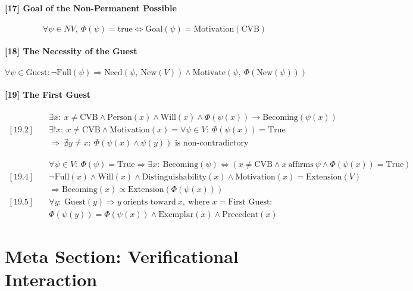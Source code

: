 \documentclass[12pt]{article}
\begin{document}
\paragraph{[17] Goal of the Non-Permanent Possible}
\[
\forall \psi \in NV,\ \Phi(\psi) = \text{true} \Leftrightarrow \text{Goal}(\psi) = \text{Motivation}(\text{CVB})
\]

\paragraph{[18] The Necessity of the Guest}
\[
\forall \psi \in \text{Guest}: \neg \text{Full}(\psi) \Rightarrow \text{Need}(\psi,\ \text{New}(V)) \land \text{Motivate}(\psi,\ \Phi(\text{New}(\psi)))
\]

\paragraph{[19] The First Guest}
\begin{align*}
[19.1] &\quad \exists x:\ x \ne \text{CVB} \land \text{Person}(x) \land \text{Will}(x) \land \Phi(\psi(x)) \rightarrow \text{Becoming}(\psi(x)) \\
[19.2] &\quad \exists! x:\ x \ne \text{CVB} \land \text{Motivation}(x) = \forall \psi \in V:\ \Phi(\psi(x)) = \text{True} \\
&\quad \Rightarrow\ \nexists y \ne x:\ \Phi(\psi(x) \land \psi(y)) \text{ is non-contradictory}
\end{align*}

\begin{align*}
[19.3] &\quad \forall \psi \in V:\ \Phi(\psi) = \text{True} \Rightarrow \exists x:\ \text{Becoming}(\psi) \Leftrightarrow (x \ne \text{CVB} \land x\ \text{affirms}\ \psi \land \Phi(\psi(x)) = \text{True}) \\
[19.4] &\quad \neg \text{Full}(x) \land \text{Will}(x) \land \text{Distinguishability}(x) \land \text{Motivation}(x) = \text{Extension}(V) \\
&\quad \Rightarrow \text{Becoming}(x) \propto \text{Extension}(\Phi(\psi(x))) \\
[19.5] &\quad \forall y:\ \text{Guest}(y) \Rightarrow y\ \text{orients toward}\ x,\ \text{where } x = \text{First Guest:} \\
&\quad \Phi(\psi(y)) = \Phi(\psi(x)) \land \text{Exemplar}(x) \land \text{Precedent}(x)
\end{align*}


\section*{Meta Section: Verificational Interaction}
\end{document}

